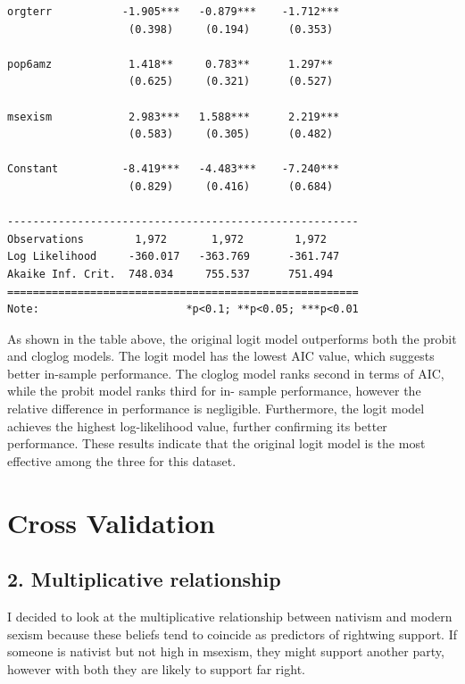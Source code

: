 \documentclass[
  letterpaper,
  DIV=11,
  numbers=noendperiod]{scrartcl}
\begin{document}
\begin{verbatim}
orgterr           -1.905***   -0.879***    -1.712***   
                   (0.398)     (0.194)      (0.353)    
                                                       
pop6amz            1.418**     0.783**      1.297**    
                   (0.625)     (0.321)      (0.527)    
                                                       
msexism            2.983***   1.588***      2.219***   
                   (0.583)     (0.305)      (0.482)    
                                                       
Constant          -8.419***   -4.483***    -7.240***   
                   (0.829)     (0.416)      (0.684)    
                                                       
-------------------------------------------------------
Observations        1,972       1,972        1,972     
Log Likelihood     -360.017   -363.769      -361.747   
Akaike Inf. Crit.  748.034     755.537      751.494    
=======================================================
Note:                       *p<0.1; **p<0.05; ***p<0.01
\end{verbatim}

As shown in the table above, the original logit model outperforms both
the probit and cloglog models. The logit model has the lowest AIC value,
which suggests better in-sample performance. The cloglog model ranks
second in terms of AIC, while the probit model ranks third for in-
sample performance, however the relative difference in performance is
negligible. Furthermore, the logit model achieves the highest
log-likelihood value, further confirming its better performance. These
results indicate that the original logit model is the most effective
among the three for this dataset.

\section{Cross Validation}\label{cross-validation}

\subsection{2. Multiplicative
relationship}\label{multiplicative-relationship}

I decided to look at the multiplicative relationship between nativism
and modern sexism because these beliefs tend to coincide as predictors
of rightwing support. If someone is nativist but not high in msexism,
they might support another party, however with both they are likely to
support far right.
\end{document}

